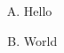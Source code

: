 \documentclass{article}
\begin{document}
\begin{enumerate}[A.]
    \item Hello
    \item World
\end{enumerate}
\end{document}
